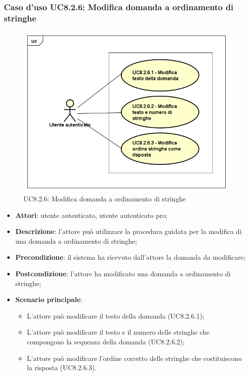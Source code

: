 \subsubsection{Caso d’uso UC8.2.6: Modifica domanda a ordinamento di stringhe}
	\label{UC8.2.6}
	\begin{figure}[ht]
		\centering
		\includegraphics[scale=0.45,keepaspectratio]{UML/UC8_2_6.png}
		\caption{UC8.2.6: Modifica domanda a ordinamento di stringhe}
	\end{figure}
	\FloatBarrier
\begin{itemize}
	\item\textbf{Attori}: utente autenticato, utente autenticato pro;
	\item\textbf{Descrizione}: l'attore può utilizzare la procedura guidata per la modifica di una domanda a ordinamento di stringhe;
	\item\textbf{Precondizione}: il sistema ha ricevuto dall'attore la domanda da modificare; 
	\item \textbf{Postcondizione}: l'attore ha modificato una domanda a ordinamento di stringhe;
	\item\textbf{Scenario principale}:
		\begin{itemize}
			\item L'attore può modificare il testo della domanda (UC8.2.6.1);
			\item L'attore può modificare il testo e il numero delle stringhe che compongono la sequenza della domanda (UC8.2.6.2);
			\item L'attore può modificare l'ordine corretto delle stringhe che costituiscono la risposta (UC8.2.6.3).
		\end{itemize}
\end{itemize}

